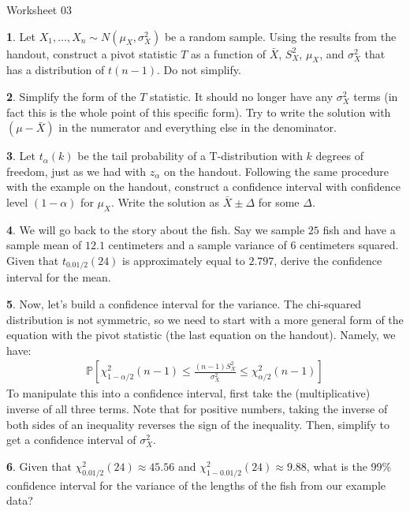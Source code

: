 \documentclass{tufte-handout}
\begin{document}
\justify

{\LARGE Worksheet 03}

\vspace*{18pt}


\textbf{1}. Let $X_1, \ldots, X_n \sim N(\mu_X, \sigma_X^2)$ be a random sample. Using
the results from the handout, construct a pivot statistic $T$ as a function
of $\bar{X}$, $S_X^2$, $\mu_X$, and $\sigma_X^2$ that has a distribution of
$t(n-1)$. Do not simplify.

\textbf{2}. Simplify the form of the $T$ statistic. It should no longer have any
$\sigma_X^2$ terms (in fact this is the whole point of this specific form). 
Try to write the solution with $(\mu - \bar{X})$ in the numerator and
everything else in the denominator.

\textbf{3}. Let $t_\alpha(k)$ be the tail probability of a T-distribution with $k$
degrees of freedom, just as we had with $z_\alpha$ on the handout. Following
the same procedure with the example on the handout, construct a confidence
interval with confidence level $(1 - \alpha)$ for $\mu_X$. Write the solution
as $\bar{X} \pm \Delta$ for some $\Delta$.

\textbf{4}. We will go back to the story about the fish. Say we sample $25$ fish and
have a sample mean of $12.1$ centimeters and a sample variance of $6$
centimeters squared. Given that $t_{0.01/2}(24)$ is approximately equal
to $2.797$, derive the confidence interval for the mean.


\textbf{5}. Now, let's build a confidence interval for the variance. The chi-squared 
distribution is not symmetric, so we need to start with a more general
form of the equation with the pivot statistic (the last equation on the
handout). Namely, we have:
\begin{align*}
\mathbb{P}\left[ \chi^2_{1 - \alpha/2}(n-1) \leq \frac{(n-1)S^2_X}{\sigma_X^2} \leq \chi^2_{\alpha/2}(n-1) \right]
\end{align*}
To manipulate this into a confidence interval, first take the (multiplicative)
inverse of all three terms. Note that for positive numbers, taking the inverse
of both sides of an inequality reverses the sign of the inequality. Then,
simplify to get a confidence interval of $\sigma_X^2$.

\textbf{6}. Given that $\chi^2_{0.01/2}(24) \approx 45.56$ and $\chi^2_{1-0.01/2}(24) \approx 9.88$,
what is the 99\% confidence interval for the variance of the lengths of the
fish from our example data?

\end{document}
